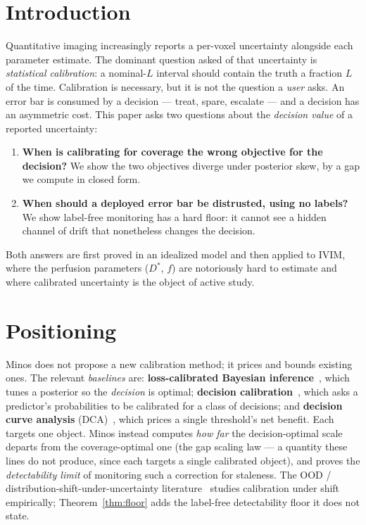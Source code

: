 \documentclass[11pt]{article}
\theoremstyle{definition}
\begin{document}
\section{Introduction}\label{sec:intro}
Quantitative imaging increasingly reports a per-voxel uncertainty alongside each parameter estimate.
The dominant question asked of that uncertainty is \emph{statistical calibration}: a nominal-$L$
interval should contain the truth a fraction $L$ of the time. Calibration is necessary, but it is not
the question a \emph{user} asks. An error bar is consumed by a decision --- treat, spare, escalate
--- and a decision has an asymmetric cost. This paper asks two questions about the \emph{decision
value} of a reported uncertainty:
\begin{enumerate}
\item \textbf{When is calibrating for coverage the wrong objective for the decision?} We show the two
objectives diverge under posterior skew, by a gap we compute in closed form.
\item \textbf{When should a deployed error bar be distrusted, using no labels?} We show label-free
monitoring has a hard floor: it cannot see a hidden channel of drift that nonetheless changes the
decision.
\end{enumerate}
Both answers are first proved in an idealized model and then applied to IVIM, where the perfusion
parameters ($D^*$, $f$) are notoriously hard to estimate and where calibrated uncertainty is the
object of active study.

\section{Positioning}\label{sec:pos}
Minos does not propose a new calibration method; it prices and bounds existing ones. The relevant
\emph{baselines} are: \textbf{loss-calibrated Bayesian inference}~\cite{lacostejulien2011,vadera2021},
which tunes a posterior so the \emph{decision} is optimal; \textbf{decision
calibration}~\cite{zhao2021}, which asks a predictor's probabilities to be calibrated for a class of
decisions; and \textbf{decision curve analysis} (DCA)~\cite{vickers2006}, which prices a single
threshold's net benefit. Each targets one object. Minos instead computes \emph{how far} the
decision-optimal scale departs from the coverage-optimal one (the gap scaling law --- a quantity
these lines do not produce, since each targets a single calibrated object), and proves the
\emph{detectability limit} of monitoring such a correction for staleness. The OOD /
distribution-shift-under-uncertainty literature~\cite{ovadia2019} studies calibration under shift
empirically; Theorem~\ref{thm:floor} adds the label-free detectability floor it does not state.
\end{document}
